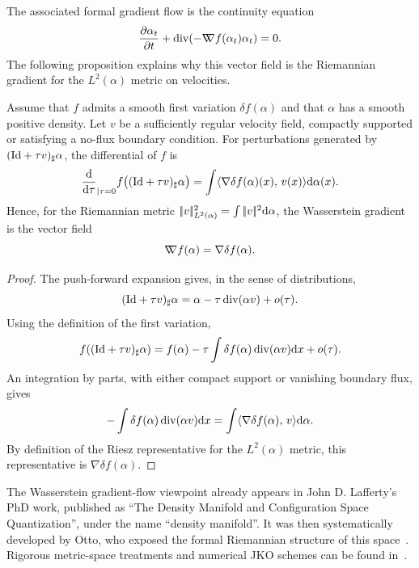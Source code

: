 The associated formal gradient flow is the continuity equation
\begin{equation}
    \frac{\partial \alpha_t}{\partial t} + \operatorname{div}(-\mathord{\nabla\mkern-9.3mu\nabla} f(\alpha_t) \alpha_t) = 0. \label{eq:wassflow-pde}
\end{equation}
The following proposition explains why this vector field is the Riemannian gradient for the $L^2(\alpha)$ metric on velocities.
%
\begin{proposition}\label{prop-formal-wass-gradient}
	Assume that $f$ admits a smooth first variation $\delta f(\alpha)$ and that $\alpha$ has a smooth positive density. Let $v$ be a sufficiently regular velocity field, compactly supported or satisfying a no-flux boundary condition. For perturbations generated by $(\mathrm{Id}+\tau v)_\sharp\alpha$, the differential of $f$ is
	\[
		\frac{\mathrm{d}}{\mathrm{d}\tau}_{|\tau=0}
		f\big((\mathrm{Id}+\tau v)_\sharp\alpha\big)
		=
		\int \langle \nabla \delta f(\alpha)(x),\,v(x)\rangle\mathrm{d}\alpha(x).
	\]
	Hence, for the Riemannian metric $|\!| v |\!|_{L^2(\alpha)}^2=\int |\!| v |\!|^2\mathrm{d}\alpha$, the Wasserstein gradient is the vector field
	\[
		\mathord{\nabla\mkern-9.3mu\nabla} f(\alpha)=\nabla \delta f(\alpha).
	\]
\end{proposition}
\begin{proof}
	The push-forward expansion gives, in the sense of distributions,
	\[
		(\mathrm{Id}+\tau v)_\sharp\alpha
		=
		\alpha-\tau\operatorname{div}(\alpha v)+o(\tau).
	\]
	Using the definition of the first variation,
	\[
		f((\mathrm{Id}+\tau v)_\sharp\alpha)
		=
		f(\alpha)-\tau\int \delta f(\alpha)\operatorname{div}(\alpha v)\mathrm{d} x+o(\tau).
	\]
	An integration by parts, with either compact support or vanishing boundary flux, gives
	\[
		-\int \delta f(\alpha)\operatorname{div}(\alpha v)\mathrm{d} x
		=
		\int \langle \nabla\delta f(\alpha),\,v\rangle\mathrm{d}\alpha.
	\]
	By definition of the Riesz representative for the $L^2(\alpha)$ metric, this representative is $\nabla\delta f(\alpha)$.
\end{proof}

The Wasserstein gradient-flow viewpoint already appears in John D. Lafferty's PhD work, published as ``The Density Manifold and Configuration Space Quantization'', under the name ``density manifold''. It was then systematically developed by Otto, who exposed the formal Riemannian structure of this space~\cite{otto2001geometry}. Rigorous metric-space treatments and numerical JKO schemes can be found in~\cite{ambrosio2006gradient,JDB-JKO,2015-Peyre-siims,gallouet2017jko}.

